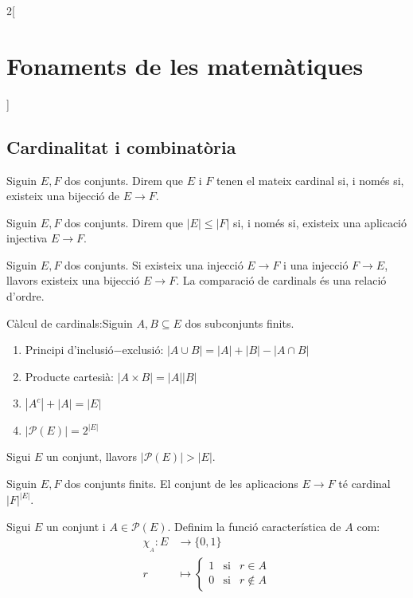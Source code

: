 \documentclass[../../../main.tex]{subfiles}
\begin{document}
\begin{multicols}{2}[\section{Fonaments de les matemàtiques}]
\subsection{Cardinalitat i combinatòria}
\begin{definition}
Siguin $E,F$ dos conjunts. Direm que $E$ i $F$ tenen el mateix cardinal si, i només si, existeix una bijecció de $E\rightarrow F$.
\end{definition}
\begin{definition}
Siguin $E,F$ dos conjunts. Direm que $|E|\leq|F|$ si, i només si, existeix una aplicació injectiva $E\rightarrow F$.
\end{definition}
\begin{theorem}
Siguin $E,F$ dos conjunts. Si existeix una injecció $E\rightarrow F$ i una injecció $F\rightarrow E$, llavors existeix una bijecció $E\rightarrow F$. La comparació de cardinals és una relació d'ordre.
\end{theorem}
\begin{prop}
Càlcul de cardinals:\newline Siguin $A,B\subseteq E$ dos subconjunts finits.
\begin{enumerate}
    \item Principi d'inclusió$-$exclusió: $|A\cup B|=|A|+|B|-|A\cap B|$
    \item Producte cartesià: $|A\times B|=|A||B|$
    \item $|A^c|+|A|=|E|$
    \item $|\mathcal{P}(E)|=2^{|E|}$
\end{enumerate}
\end{prop}
\begin{theorem}
Sigui $E$ un conjunt, llavors $|\mathcal{P}(E)|>|E|$.
\end{theorem}
\begin{prop}
Siguin $E,F$ dos conjunts finits. El conjunt de les aplicacions $E\rightarrow F$ té cardinal $|F|^{|E|}$.
\end{prop}
\begin{definition}
Sigui $E$ un conjunt i $A\in \mathcal{P}(E)$. Definim la funció característica de $A$ com: 
\begin{align*}
    \chi_{\!_A}:E&\rightarrow\{0,1\}\\
    r&\mapsto \left\{
    \begin{array}{rcl}
    1 & \text{si} & r\in A \\
    0 & \text{si} & r\notin A
    \end{array}\right.

\end{align*}
\end{definition}
\end{multicols}
\end{document}
